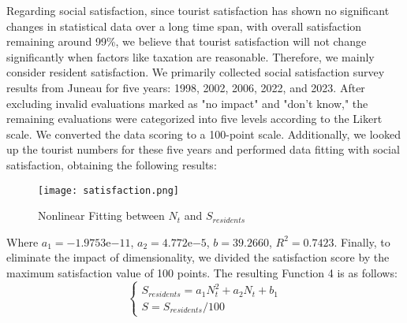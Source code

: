 \documentclass[12pt]{article}  %
\begin{document}
Regarding social satisfaction, since tourist satisfaction has shown no significant changes in statistical data over a long time span, with overall satisfaction remaining around 99\%, we believe that tourist satisfaction will not change significantly when factors like taxation are reasonable. Therefore, we mainly consider resident satisfaction.
We primarily collected social satisfaction survey results from Juneau for five years: 1998, 2002, 2006, 2022, and 2023. After excluding invalid evaluations marked as "no impact" and "don't know," the remaining evaluations were categorized into five levels according to the Likert scale. We converted the data scoring to a 100-point scale. Additionally, we looked up the tourist numbers for these five years and performed data fitting with social satisfaction, obtaining the following results:
\begin{figure}[H]
	\centering
	\texttt{[image: satisfaction.png]}
	\caption{Nonlinear Fitting between $N_t$ and $S_{residents}$}\label{fig:satisfaction}
\end{figure}
Where $a_1 = -1.9753 \mathrm{e}{-11}$, $a_2 = 4.772\mathrm{e}{-5}$, $b = 39.2660$, $R^2 = 0.7423$. Finally, to eliminate the impact of dimensionality, we divided the satisfaction score by the maximum satisfaction value of 100 points. The resulting Function 4 is as follows:
\begin{equation}
	\begin{cases}
		S_{residents}=a_{1}N_{t}^2+a_{2}N_{t} + b_{1} \\
		S=S_{residents}/100
	\end{cases}
\end{equation}
\end{document}
